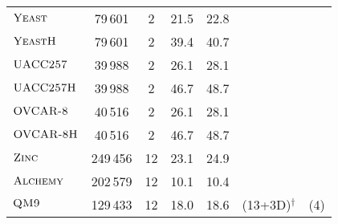 \documentclass{article}
\theoremstyle{definition}
\newcommand{\cmark}{\ding{51}}%
\begin{document}
\begin{table}[h]
\begin{center}
{\begin{tabular}{@{}lcccccc@{}}
				$\textsc{Yeast}$       &   79\,601&	2&	21.5&	22.8                & \cmark  & \cmark           \\
				$\textsc{YeastH}$       &  79\,601&	2&	39.4&	40.7                  & \cmark  & \cmark           \\
				$\textsc{UACC257}$       &      39\,988&	2&	26.1&	28.1                      & \cmark  & \cmark           \\
				$\textsc{UACC257H}$       &  39\,988&	2&	46.7&	48.7      & \cmark  & \cmark           \\
				$\textsc{OVCAR-8}$       &      	40\,516&	2&	26.1&	28.1             & \cmark  & \cmark           \\
				$\textsc{OVCAR-8H}$       &        40\,516	&2&	46.7&	48.7              & \cmark  & \cmark           \\
				\midrule        
				$\textsc{Zinc}$       &  249\,456 &12	&23.1 &	24.9     & \cmark  & \cmark           \\
				
				$\textsc{Alchemy}$       & 202\,579 &12	& 10.1 &	10.4 	     & \cmark  & \cmark           \\
				$\textsc{QM9}$       &129\,433  &12	& 18.0 &	18.6     & \cmark (13+3D)$^\dagger$  & \cmark (4)          \\
				\bottomrule
		\end{tabular}}
		\label{ds}
	\end{center}
\end{table}
\end{document}
